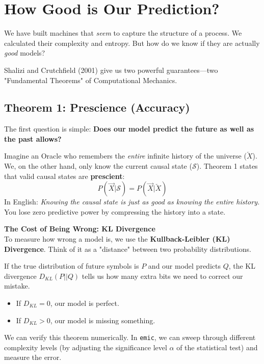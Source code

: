 \section{How Good is Our Prediction?}
\label{sec:theorems}

We have built machines that \textit{seem} to capture the structure of a process. We calculated their complexity and entropy. But how do we know if they are actually \textit{good} models?

Shalizi and Crutchfield (2001) give us two powerful guarantees---two "Fundamental Theorems" of Computational Mechanics.

\subsection{Theorem 1: Prescience (Accuracy)}

The first question is simple: \textbf{Does our model predict the future as well as the past allows?}

Imagine an Oracle who remembers the \textit{entire} infinite history of the universe ($\overleftarrow{X}$). We, on the other hand, only know the current causal state ($\mathcal{S}$).
Theorem 1 states that valid causal states are \textbf{prescient}:
\[ P(\vec{X} | \mathcal{S}) = P(\vec{X} | \overleftarrow{X}) \]
In English: \textit{Knowing the causal state is just as good as knowing the entire history.} You lose zero predictive power by compressing the history into a state.

\begin{intuition}
    \textbf{The Cost of Being Wrong: KL Divergence}\\
    To measure how wrong a model is, we use the \textbf{Kullback-Leibler (KL) Divergence}. Think of it as a "distance" between two probability distributions.

    If the true distribution of future symbols is $P$ and our model predicts $Q$, the KL divergence $D_{KL}(P || Q)$ tells us how many extra bits we need to correct our mistake.
    \begin{itemize}
        \item If $D_{KL} = 0$, our model is perfect.
        \item If $D_{KL} > 0$, our model is missing something.
    \end{itemize}
\end{intuition}

We can verify this theorem numerically. In \texttt{emic}, we can sweep through different complexity levels (by adjusting the significance level $\alpha$ of the statistical test) and measure the error.

